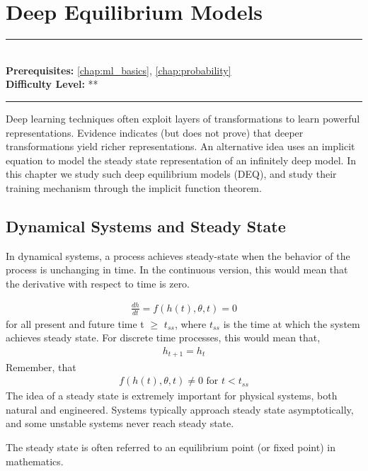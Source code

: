 \documentclass[book.tex]{subfiles}
\begin{document}
\chapter{Deep Equilibrium Models}
\label{chap:deep_equilibrium}
\noindent\rule{11cm}{0.4pt} \\
\textbf{Prerequisites:}  \autoref{chap:ml_basics}, \autoref{chap:probability}  \\
\textbf{Difficulty Level:} ** \\
\noindent\rule{11cm}{0.4pt}
\vspace{5mm}

Deep learning techniques often exploit layers of transformations to learn powerful representations. Evidence indicates (but does not prove) that deeper transformations yield richer representations. An alternative idea uses an implicit equation to model the steady state representation of an infinitely deep model. In this chapter we study such deep equilibrium models (DEQ)\cite{bai2019deep}, \cite{bai2020multiscale} and study their training mechanism through the implicit function theorem.

\section{Dynamical Systems and Steady State}

In dynamical systems, a process achieves steady-state when the behavior of the process is unchanging in time.  In the continuous version, this would mean that the derivative with respect to time is zero.

\begin{align}
\frac{dh}{dt} = f(h(t),\theta,t) = 0
\end{align}
for all present and future time t $\geq$ $t_{ss}$, where $t_{ss}$ is the time at which the system achieves steady state. For discrete time processes, this would mean that,
\begin{align}
    h_{t+1} = h_{t}
\end{align}
Remember, that \begin{align}f(h(t),\theta,t) \neq 0 \textrm { for }t < t_{ss}
\end{align}  
The idea of a steady state is extremely important for physical systems, both natural and engineered. Systems typically approach steady state asymptotically, and some unstable systems never reach steady state.



The steady state is often referred to an equilibrium point (or fixed point) in mathematics.  
\end{document}
